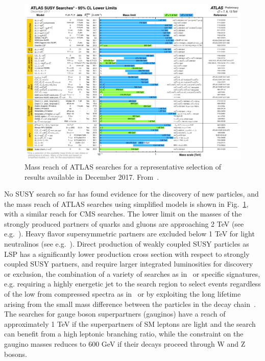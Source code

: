 \begin{figure}[!htpb]
\includegraphics[width=\textwidth]{figures/ATLAS_SUSY_Summary.pdf}
\caption{Mass reach of ATLAS searches for a representative selection of results available in December 2017. From~\cite{ATLASSUSYSummary}.\label{fig:SUSYSummary}}
\end{figure}

No SUSY search so far has found evidence for the discovery of new particles, and the mass
reach of ATLAS searches using simplified models is shown in Fig.~\ref{fig:SUSYSummary}, with a similar reach for CMS searches. 
The lower limit on the masses of the strongly produced partners of quarks and gluons %
are approaching 2 TeV (see e.g.~\cite{Aaboud:2017bac}). 
Heavy flavor supersymmetric partners are excluded below 1 TeV for light neutralinos (see e.g.~\cite{Sirunyan:2017wif}). %
Direct production of weakly coupled SUSY particles as LSP has a significantly lower production cross section with respect to strongly coupled SUSY partners,
and require larger integrated luminosities for discovery or exclusion, the combination of a variety of searches 
as in~\cite{Sirunyan:2018ubx} or specific signatures, e.g. requiring a highly energetic jet to the search
region to select events regardless of the low \MET from compressed spectra as in~\cite{Aaboud:2017leg} or
by exploiting the long lifetime arising from the small mass difference between the particles in the decay chain~\cite{ATL-PHYS-PUB-2017-019}. %
The searches for gauge boson superpartners (gauginos) have a reach of approximately 1 TeV if the superpartners
of SM leptons are light and the search can benefit from a high leptonic branching ratio, 
while the constraint on the gaugino masses reduces to 600 GeV if their decays proceed
through W and Z bosons.

